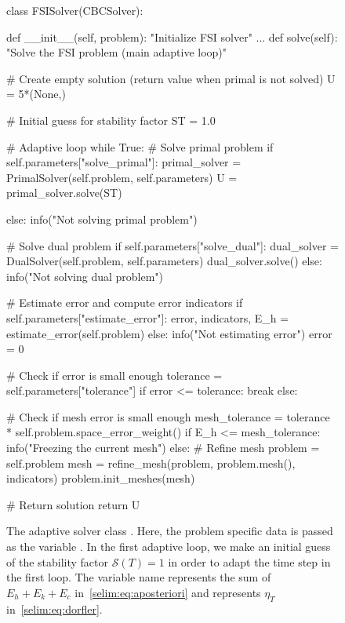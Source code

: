 \begin{figure}
\label{selim:fig:FSISolver}
\caption{The adaptive solver class . Here, the
  problem specific data is passed as the variable . In
  the first adaptive loop, we make an initial guess of the stability
  factor $\mathcal{S}(T)=1$ in order to adapt the time step in the
  first loop.  The variable name  represents the sum of
  $E_h + E_k + E_c$ in~\eqref{selim:eq:aposteriori} and
   represents $\eta_T$ in~\eqref{selim:eq:dorfler}.}
\begin{python}
class FSISolver(CBCSolver):

    def __init__(self, problem):
        "Initialize FSI solver"
            ...
    def solve(self):
        "Solve the FSI problem (main adaptive loop)"

        # Create empty solution (return value when primal is not solved)
        U = 5*(None,)

        # Initial guess for stability factor
        ST = 1.0

        # Adaptive loop
        while True:
            # Solve primal problem
            if self.parameters["solve_primal"]:
                primal_solver = PrimalSolver(self.problem, self.parameters)
                U = primal_solver.solve(ST)

            else:
                info("Not solving primal problem")

            # Solve dual problem
            if self.parameters["solve_dual"]:
                dual_solver = DualSolver(self.problem, self.parameters)
                dual_solver.solve()
            else:
                info("Not solving dual problem")

            # Estimate error and compute error indicators
            if self.parameters["estimate_error"]:
                error, indicators, E_h = estimate_error(self.problem)
            else:
                info("Not estimating error")
                error = 0

            # Check if error is small enough
            tolerance = self.parameters["tolerance"]
            if error <= tolerance:
                break
            else:

            # Check if mesh error is small enough
            mesh_tolerance = tolerance * self.problem.space_error_weight()
            if E_h <= mesh_tolerance:
                info("Freezing the current mesh")
            else:
                # Refine mesh
                problem = self.problem
                mesh = refine_mesh(problem,
                                   problem.mesh(),
                                   indicators)
                problem.init_meshes(mesh)

        # Return solution
        return U
\end{python}
\end{figure}

